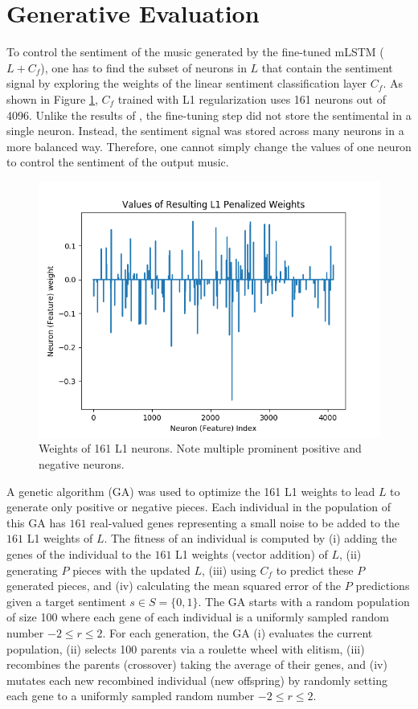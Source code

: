 \section{Generative Evaluation}

To control the sentiment of the music generated by the fine-tuned mLSTM ($L + C_f$), one has to find the subset of neurons in $L$ that contain the sentiment signal by exploring the weights of the linear sentiment classification layer $C_f$. As shown in Figure \ref{fig:final_weights}, $C_f$ trained with L1 regularization uses 161 neurons out of 4096. Unlike the results of \citet{radford_2017}, the fine-tuning step did not store the sentimental in a single neuron. Instead, the sentiment signal was stored across many neurons in a more balanced way. Therefore, one cannot simply change the values of one neuron to control the sentiment of the output music.

\begin{figure}[!h]
 \centering
 \includegraphics[width=\columnwidth]{imgs/ismir19/weights.png}
 \caption{Weights of 161 L1 neurons. Note multiple prominent positive and negative neurons.}
 \label{fig:final_weights}
\end{figure}

A genetic algorithm (GA) was used to optimize the 161 L1 weights to lead $L$ to generate only positive or negative pieces. Each individual in the population of this GA has $161$ real-valued genes representing a small noise to be added to the $161$ L1 weights of $L$. The fitness of an individual is computed by (i) adding the genes of the individual to the $161$ L1 weights (vector addition) of $L$, (ii) generating $P$ pieces with the updated $L$, (iii) using $C_f$ to predict these $P$ generated pieces, and (iv) calculating the mean squared error of the $P$ predictions given a target sentiment $s \in S = \{0, 1\}$. The GA starts with a random population of size 100 where each gene of each individual is a uniformly sampled random number $-2 \leq r \leq 2$. For each generation, the GA (i) evaluates the current population, (ii) selects 100 parents via a roulette wheel with elitism, (iii) recombines the parents (crossover) taking the average of their genes, and (iv) mutates each new recombined individual (new offspring) by randomly setting each gene to a uniformly sampled random number $-2 \leq r \leq 2$.


